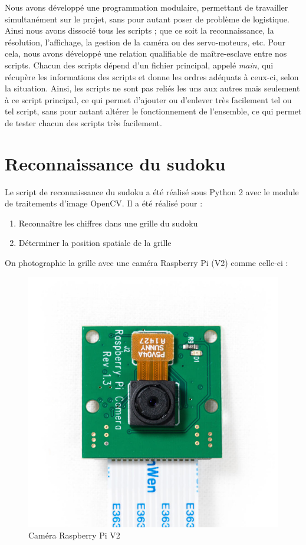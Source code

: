 \documentclass[12pt,a4paper]{report}
\begin{document}
	Nous avons développé une programmation modulaire, permettant de travailler simultanément sur le projet, sans pour autant poser de problème de logistique. Ainsi nous avons dissocié tous les scripts ; que ce soit la reconnaissance, la résolution, l'affichage, la gestion de la caméra ou des servo-moteurs, etc. Pour cela, nous avons développé une relation qualifiable de maître-esclave entre nos scripts. Chacun des scripts dépend d'un fichier principal, appelé \emph{main}, qui récupère les informations des scripts et donne les ordres adéquats à ceux-ci, selon la situation. Ainsi, les scripts ne sont pas reliés les uns aux autres mais seulement à ce script principal, ce qui permet d'ajouter ou d'enlever très facilement tel ou tel script, sans pour autant altérer le fonctionnement de l'ensemble, ce qui permet de tester chacun des scripts très facilement.
	
\section{Reconnaissance du sudoku}
	Le script de reconnaissance du sudoku a été réalisé sous Python 2 avec le module de traitements d'image OpenCV. Il a été réalisé pour :
	\begin{enumerate}
	\item Reconnaître les chiffres dans une grille du sudoku
	\item Déterminer la position spatiale de la grille
	\end{enumerate}
	\newpage
	On photographie la grille avec une caméra Raspberry Pi (V2) comme celle-ci :
	\begin{figure}[!h]
 \center
 \includegraphics[scale=0.2]{../pictures/camera.jpg}
 \caption{Caméra Raspberry Pi V2}
\end{figure}
\end{document}
